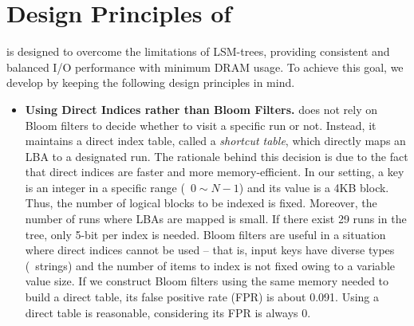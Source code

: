 \section{Design Principles of \ours{}}
\label{sec:overall}
\ours{} is designed to overcome the limitations of LSM-trees,
providing consistent and balanced I/O performance with minimum DRAM usage.
To achieve this goal, we develop 
\ours{} by keeping the following design principles in mind.

\begin{itemize}[leftmargin=*]
\item \textbf{Using Direct Indices rather than Bloom Filters.}
\ours{} does not rely on Bloom filters to decide whether to visit a specific
run or not.  Instead, it maintains a direct index table, called a
\textit{shortcut table}, which directly maps an LBA to a designated run.  The
rationale behind this decision is due to the fact that direct indices are faster
and more memory-efficient.  In our setting, a key is an integer in a specific
range (\eg~$0\sim N-1$) and its value is a 4KB block. Thus, the number of logical
blocks to be indexed is fixed. Moreover, the number of runs where
LBAs are mapped is small.  If there exist 29 runs in the tree, only 5-bit per
index is needed.  Bloom filters are useful in a situation where direct indices
cannot be used -- that is, input keys have diverse types (\eg~strings) and the
number of items to index is not fixed owing to a variable value size.  If we
construct Bloom filters using the same memory needed to build a direct table,
its false positive rate (FPR) is about 0.091. Using a direct table is reasonable, 
considering its FPR is always 0.


\end{itemize}
